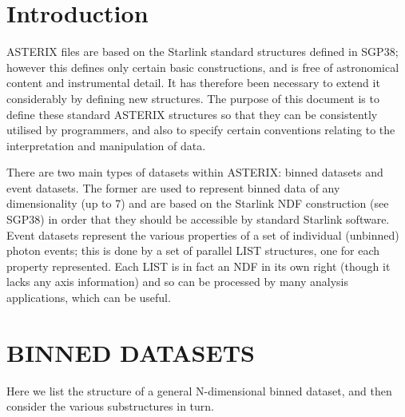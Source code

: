 \parskip=4.0mm      %
\markright{\stardocname}

\tableofcontents

\newpage

\section{Introduction}

ASTERIX files are based on the Starlink standard structures defined in
SGP38;  however  this defines only certain basic constructions, and is
free  of  astronomical  content  and  instrumental  detail.   It   has
therefore  been  necessary  to  extend it considerably by defining new
structures.  The purpose of this document is to define these  standard
ASTERIX  structures  so  that  they  can  be  consistently utilised by
programmers, and also to specify certain conventions relating  to  the
interpretation and manipulation of data.

There are two main types of datasets within ASTERIX:  binned  datasets
and  event  datasets.  The former are used to represent binned data of
any dimensionality (up to  7)  and  are  based  on  the  Starlink  NDF
construction  (see  SGP38)  in order that they should be accessible by
standard Starlink software.   Event  datasets  represent  the  various
properties  of  a  set of individual (unbinned) photon events; this is
done by a set of parallel  LIST  structures,  one  for  each  property
represented.   Each LIST is in fact an NDF in its own right (though it
lacks any axis information) and so can be processed by  many  analysis
applications, which can be useful.

\section{BINNED DATASETS}

Here we list the structure of a general N-dimensional binned  dataset,
and then consider the various substructures in turn.

